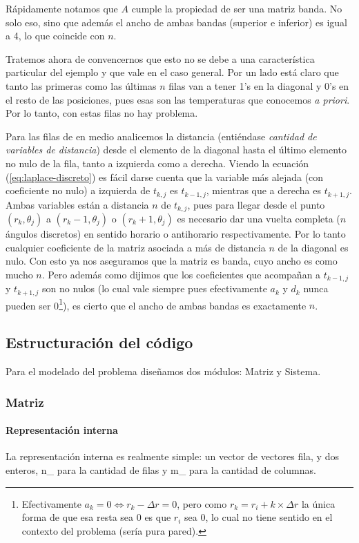 Rápidamente notamos que $A$ cumple la propiedad de ser una matriz banda. No solo eso, sino que además el ancho de ambas bandas (superior e inferior) es igual a 4, lo que coincide con $n$.

Tratemos ahora de convencernos que esto no se debe a una característica particular del ejemplo y que vale en el caso general.
Por un lado está claro que tanto las primeras como las últimas $n$ filas van a tener 1's en la diagonal y 0's en el resto de las posiciones, pues esas son las temperaturas que conocemos \textit{a priori}. Por lo tanto, con estas filas no hay problema.

Para las filas de en medio analicemos la distancia (entiéndase \textit{cantidad de variables de distancia}) desde el elemento de la diagonal hasta el último elemento no nulo de la fila, tanto a izquierda como  a derecha. Viendo la ecuación (\ref{eq:laplace-discreto}) es fácil darse cuenta que la variable más alejada (con coeficiente no nulo) a izquierda de $t_{k,j}$ es $t_{k-1, j}$, mientras que a derecha es $t_{k+1, j}$. Ambas variables están a distancia $n$ de $t_{k,j}$, pues para llegar desde el punto $(r_k, \theta_j)$ a $(r_k-1, \theta_j)$ o $(r_k+1, \theta_j)$ es necesario dar una vuelta completa ($n$ ángulos discretos) en sentido horario o antihorario respectivamente. Por lo tanto cualquier coeficiente de la matriz asociada a más de distancia $n$ de la diagonal es nulo. Con esto ya nos aseguramos que la matriz es banda, cuyo ancho es como mucho $n$. Pero además como dijimos que los coeficientes que acompañan a $t_{k-1, j}$ y $t_{k+1, j}$ son no nulos (lo cual vale siempre pues efectivamente $a_k$ y $d_k$ nunca pueden ser 0\footnote{Efectivamente $a_k = 0 \Leftrightarrow r_k - \Delta r = 0$, pero como $r_k = r_i + k\times \Delta r$ la única forma de que esa resta sea 0 es que $r_i$ sea 0, lo cual no tiene sentido en el contexto del problema (sería pura pared).}), es cierto que el ancho de ambas bandas es exactamente $n$. 


\subsection{Estructuración del código}
Para el modelado del problema diseñamos dos módulos: Matriz y Sistema. 

\subsubsection{Matriz}
\paragraph{Representación interna}
La representación interna es realmente simple: un vector de vectores fila, y dos enteros, n\_ para la cantidad de filas y m\_ para la cantidad de columnas.

